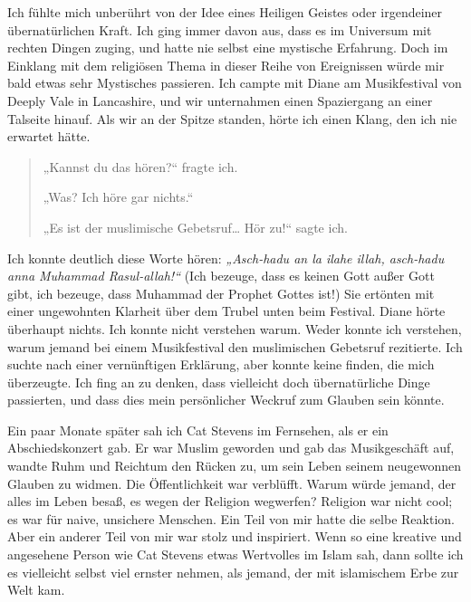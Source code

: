 \documentclass[12pt]{memoir}
\begin{document}
Ich fühlte mich unberührt von der Idee eines Heiligen Geistes
oder irgendeiner übernatürlichen Kraft.
Ich ging immer davon aus, dass es im Universum mit rechten Dingen zuging,
und hatte nie selbst eine mystische Erfahrung.
Doch im Einklang mit dem religiösen Thema in dieser Reihe von Ereignissen
würde mir bald etwas sehr Mystisches passieren.
Ich campte mit Diane am Musikfestival von Deeply Vale in Lancashire,
und wir unternahmen einen Spaziergang an einer Talseite hinauf.
Als wir an der Spitze standen, hörte ich einen Klang,
den ich nie erwartet hätte.

\begin{quote}
„Kannst du das hören?“ fragte ich.

„Was? Ich höre gar nichts.“

„Es ist der muslimische Gebetsruf… Hör zu!“ sagte ich.
\end{quote}

Ich konnte deutlich diese Worte hören:
\emph{„Asch-hadu an la ilahe illah, asch-hadu anna Muhammad Rasul-allah!“}
(Ich bezeuge, dass es keinen Gott außer Gott gibt, ich bezeuge,
dass Muhammad der Prophet Gottes ist!)
Sie ertönten mit einer ungewohnten Klarheit
über dem Trubel unten beim Festival.
Diane hörte überhaupt nichts.
Ich konnte nicht verstehen warum.
Weder konnte ich verstehen, warum jemand bei einem Musikfestival
den muslimischen Gebetsruf rezitierte.
Ich suchte nach einer vernünftigen Erklärung, aber konnte keine finden,
die mich überzeugte.
Ich fing an zu denken, dass vielleicht doch übernatürliche Dinge passierten,
und dass dies mein persönlicher Weckruf zum Glauben sein könnte.

Ein paar Monate später sah ich Cat Stevens im Fernsehen,
als er ein Abschiedskonzert gab.
Er war Muslim geworden und gab das Musikgeschäft auf,
wandte Ruhm und Reichtum den Rücken zu,
um sein Leben seinem neugewonnen Glauben zu widmen.
Die Öffentlichkeit war verblüfft.
Warum würde jemand, der alles im Leben besaß, es wegen der Religion wegwerfen?
Religion war nicht cool; es war für naive, unsichere Menschen.
Ein Teil von mir hatte die selbe Reaktion.
Aber ein anderer Teil von mir war stolz und inspiriert.
Wenn so eine kreative und angesehene Person wie Cat Stevens
etwas Wertvolles im Islam sah,
dann sollte ich es vielleicht selbst viel ernster nehmen,
als jemand, der mit islamischem Erbe zur Welt kam.
\end{document}

